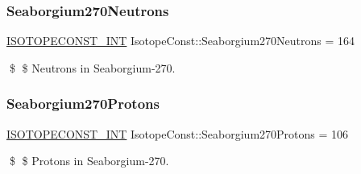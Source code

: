 \subsubsection{\texorpdfstring{Seaborgium270\+Neutrons}{Seaborgium270Neutrons}}
{\footnotesize\ttfamily \mbox{\hyperlink{group___isotope_const-_macros_ga5f18360b3e99483a35c32d789e62621c}{I\+S\+O\+T\+O\+P\+E\+C\+O\+N\+S\+T\+\_\+\+I\+NT}} Isotope\+Const\+::\+Seaborgium270\+Neutrons = 164}

\$ \$ Neutrons in Seaborgium-\/270. \mbox{\label{group___isotope_const-_seaborgium-_sg270_ga0cb8192ddd2fdfea54bfbb26405b44ef}} 
\subsubsection{\texorpdfstring{Seaborgium270\+Protons}{Seaborgium270Protons}}
{\footnotesize\ttfamily \mbox{\hyperlink{group___isotope_const-_macros_ga5f18360b3e99483a35c32d789e62621c}{I\+S\+O\+T\+O\+P\+E\+C\+O\+N\+S\+T\+\_\+\+I\+NT}} Isotope\+Const\+::\+Seaborgium270\+Protons = 106}

\$ \$ Protons in Seaborgium-\/270. 